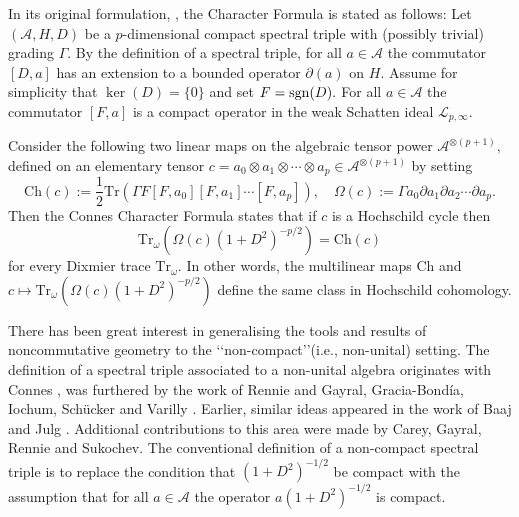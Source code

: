 \documentclass{article}
\begin{document}
In its original formulation, \cite{Connes-original-spectral-1995}, the Character Formula is stated as follows: Let $(\mathcal{A},H,D)$ be a $p$-dimensional compact spectral triple     with (possibly trivial) grading $\Gamma.$ By the definition of a spectral triple, for all $a \in \mathcal{A}$ the commutator $[D,a]$ has an extension to a bounded operator $\partial(a)$ on $H.$ Assume for simplicity that $\ker(D)=\{0\}$ and set $F={\rm sgn}(D).$ For all $a \in \mathcal{A}$ the commutator $[F,a]$ is a compact operator in the weak Schatten ideal $\mathcal{L}_{p,\infty}.$ 

Consider the following two linear maps on the algebraic tensor power $\mathcal{A}^{\otimes(p+1)},$ defined on an elementary tensor $c = a_0\otimes a_1\otimes \cdots \otimes a_p \in \mathcal{A}^{\otimes(p+1)}$ by setting
$$\mathrm{Ch}(c) := \frac{1}{2}\mathrm{Tr}(\Gamma F[F,a_0][F,a_1]\cdots[F,a_p]),\quad \Omega(c) := \Gamma a_0\partial a_1\partial a_2\cdots \partial a_p.$$
Then the Connes Character Formula states that if $c$ is a Hochschild cycle then
\begin{equation*}
\mathrm{Tr}_\omega(\Omega(c)(1+D^2)^{-p/2}) = \mathrm{Ch}(c)
\end{equation*}
for every Dixmier trace $\mathrm{Tr}_\omega$. In other words, the multilinear maps $\mathrm{Ch}$ and $c \mapsto \mathrm{Tr}_\omega(\Omega(c)(1+D^2)^{-p/2})$ define the same class in Hochschild cohomology.
    
There has been great interest in generalising the tools and results of noncommutative geometry to the \lq\lq non-compact\rq\rq (i.e., non-unital) setting. The definition of a spectral triple associated to a non-unital algebra originates with Connes \cite{Connes-reality}, was furthered by the work of Rennie \cite{Rennie}     and Gayral, Gracia-Bond\'ia, Iochum, Sch\"ucker and Varilly \cite{gayral-moyal}. Earlier, similar ideas appeared in the work of Baaj and Julg \cite{Baaj-Julg}. Additional contributions to this area were made by Carey, Gayral, Rennie and Sukochev\cite{CGRS}. The conventional definition  of a non-compact spectral triple is to replace the condition that $(1+D^2)^{-1/2}$ be compact with the assumption that for all $a \in \mathcal{A}$ the operator $a(1+D^2)^{-1/2}$ is compact.
    
\end{document}
